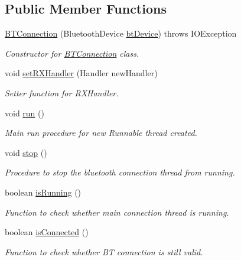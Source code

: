 \subsection*{Public Member Functions}
\begin{DoxyCompactItemize}
\item 
\hyperlink{classcom_1_1jack_1_1motorbikestatistics_1_1_b_t_connection_a55a1c23b7bcf9dc097b10b62ce7828ba}{B\+T\+Connection} (Bluetooth\+Device \hyperlink{classcom_1_1jack_1_1motorbikestatistics_1_1_b_t_connection_af49e78cef4253d96f009a9a1473e038d}{bt\+Device})  throws I\+O\+Exception 
\begin{DoxyCompactList}\small\item\em Constructor for \hyperlink{classcom_1_1jack_1_1motorbikestatistics_1_1_b_t_connection}{B\+T\+Connection} class. \end{DoxyCompactList}\item 
void \hyperlink{classcom_1_1jack_1_1motorbikestatistics_1_1_b_t_connection_aae8ee75e78f5beff98572bf3b13a60b8}{set\+R\+X\+Handler} (Handler new\+Handler)
\begin{DoxyCompactList}\small\item\em Setter function for R\+X\+Handler. \end{DoxyCompactList}\item 
void \hyperlink{classcom_1_1jack_1_1motorbikestatistics_1_1_b_t_connection_ae4c6a0897742c6a7ccfb0b43d0d987da}{run} ()
\begin{DoxyCompactList}\small\item\em Main run procedure for new Runnable thread created. \end{DoxyCompactList}\item 
\mbox{\label{classcom_1_1jack_1_1motorbikestatistics_1_1_b_t_connection_a229363b085c81e1a42037075b675677d}} 
void \hyperlink{classcom_1_1jack_1_1motorbikestatistics_1_1_b_t_connection_a229363b085c81e1a42037075b675677d}{stop} ()
\begin{DoxyCompactList}\small\item\em Procedure to stop the bluetooth connection thread from running. \end{DoxyCompactList}\item 
boolean \hyperlink{classcom_1_1jack_1_1motorbikestatistics_1_1_b_t_connection_a17b07494b0e7cba2e550054d7b47e309}{is\+Running} ()
\begin{DoxyCompactList}\small\item\em Function to check whether main connection thread is running. \end{DoxyCompactList}\item 
boolean \hyperlink{classcom_1_1jack_1_1motorbikestatistics_1_1_b_t_connection_a22f33e46d9f460d78865d4c63b645357}{is\+Connected} ()
\begin{DoxyCompactList}\small\item\em Function to check whether BT connection is still valid. \end{DoxyCompactList}\end{DoxyCompactItemize}
